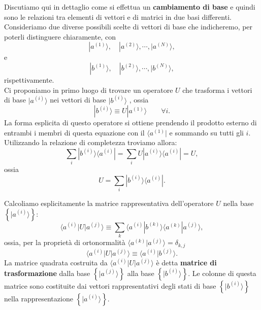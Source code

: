 Discutiamo qui in dettaglio come si effettua un \textbf{cambiamento di base} e quindi sono le relazioni tra elementi di vettori e di matrici in due basi differenti. Consideriamo due diverse possibili scelte di vettori di base che indicheremo, per poterli distinguere chiaramente, con 
	\begin{equation}
		| a^{(1)} \rangle , \quad  | a^{(2)} \rangle , \cdots , | a^{(N)} \rangle ,
	\end{equation}
e
	\begin{equation}
		| b^{(1)} \rangle , \quad | b^{(2)} \rangle , \cdots , | b^{(N)} \rangle ,
	\end{equation}
rispettivamente. \\
Ci proponiamo in primo luogo di trovare un operatore $U$ che trasforma i vettori di base $| a^{(i)} \rangle$ nei vettori di base $| b^{(i)} \rangle $ , ossia 
	\begin{equation}
		\boxed{\boxed{		
			| b^{(i)} \rangle \equiv U | a^{(1)} \rangle 
			}}\qquad \forall i .
	\end{equation}
La forma esplicita di questo operatore si ottiene prendendo il prodotto esterno di entrambi i membri di questa equazione con il $\langle a^{(1)}| $ e sommando su tutti gli $i$. Utilizzando la relazione di completezza troviamo allora:
	\begin{equation}
		\sum \limits_{i} | b^{(i)} \rangle \langle a^{(i)} |  = \sum \limits_{i} U | a^{(i)} \rangle \langle a^{(i)} |  = U ,
	\end{equation}
ossia
	\begin{equation}
		\boxed{\boxed{
			U = \sum \limits_{i} | b^{(i)} \rangle \langle a^{(i)} | .
			}}
	\end{equation}

Calcoliamo esplicitamente la matrice rappresentativa dell'operatore $U$ nella base $\left\{ | a^{(i)} \rangle    \right\} $:
	\begin{equation}
			\langle a^{(i)} | U | a^{(j)} \rangle \equiv \sum \limits_{k} \langle a^{(i)} | b^{(k)} \rangle  \langle a^{(k)} | a^{(j)} \rangle  ,
	\end{equation}
ossia, per la proprietà di ortonormalità $\langle a^{(k)} | a^{(j)} \rangle  =\delta_{k,j}$
	\begin{equation}
		\boxed{
			\langle a^{(i)} | U | a^{(j)} \rangle \equiv \langle a^{(i)} | b^{(j)} \rangle .
			}
	\end{equation}
La matrice quadrata costruita da $\langle a^{(i)} | U | a^{(j)} \rangle $ è detta \textbf{matrice di trasformazione} dalla base $\left\{ | a^{(j)} \rangle  \right\}$ alla base $\left\{ | b^{(i)} \rangle  \right\}$. Le colonne di questa matrice sono costituite dai vettori rappresentativi degli stati di base $\left\{ | b^{(i)} \rangle  \right\}$ nella rappresentazione $\left\{ | a^{(i)} \rangle  \right\}$.\\

